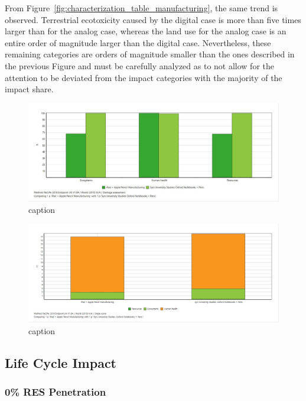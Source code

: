 From Figure~\ref{fig:characterization_table_manufacturing}, the same trend is observed. Terrestrial ecotoxicity caused by the digital case is more than five times larger than for the analog case, whereas the land use for the analog case is an entire order of magnitude larger than the digital case. Nevertheless, these remaining categories are orders of magnitude smaller than the ones described in the previous Figure and must be carefully analyzed as to not allow for the attention to be deviated from the impact categories with the majority of the impact share. 

\begin{figure}[H]
    \centering
    \includegraphics[width=\textwidth]{images/Manufacturing/Damage_Assessment_Manufacturing.JPG}
    \caption{caption}\label{fig:damage_assessment_manufacturing}
\end{figure}

\begin{figure}[H]
    \centering
    \includegraphics[width=\textwidth]{images/Manufacturing/Single_Score_Manufacturing.JPG}
    \caption{caption}\label{fig:single_score_manufacturing}
\end{figure}


\subsection{Life Cycle Impact}\label{subsec:results_life_cycle}

\subsubsection{0\% RES Penetration}

